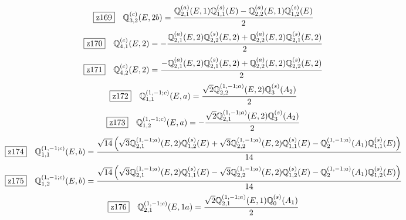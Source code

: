 \documentclass[fleqn,10pt,landscape]{jsarticle}
\begin{document}
\begin{dmath*}
\hspace*{3mm}\fbox{z169}\quad \mathbb{Q}_{3,2}^{(c)}(E,2b)=\frac{\mathbb{Q}_{2,1}^{(a)}(E,1) \mathbb{Q}_{1,1}^{(s)}(E) - \mathbb{Q}_{2,2}^{(a)}(E,1) \mathbb{Q}_{1,2}^{(s)}(E)}{2}
\end{dmath*}
\begin{dmath*}
\hspace*{3mm}\fbox{z170}\quad \mathbb{Q}_{4,1}^{(c)}(E,2)=- \frac{\mathbb{Q}_{2,1}^{(a)}(E,2) \mathbb{Q}_{2,2}^{(s)}(E,2) + \mathbb{Q}_{2,2}^{(a)}(E,2) \mathbb{Q}_{2,1}^{(s)}(E,2)}{2}
\end{dmath*}
\begin{dmath*}
\hspace*{3mm}\fbox{z171}\quad \mathbb{Q}_{4,2}^{(c)}(E,2)=\frac{- \mathbb{Q}_{2,1}^{(a)}(E,2) \mathbb{Q}_{2,1}^{(s)}(E,2) + \mathbb{Q}_{2,2}^{(a)}(E,2) \mathbb{Q}_{2,2}^{(s)}(E,2)}{2}
\end{dmath*}
\begin{dmath*}
\hspace*{3mm}\fbox{z172}\quad \mathbb{Q}_{1,1}^{(1,-1;c)}(E,a)=\frac{\sqrt{2} \mathbb{Q}_{2,2}^{(1,-1;a)}(E,2) \mathbb{Q}_{3}^{(s)}(A_{2})}{2}
\end{dmath*}
\begin{dmath*}
\hspace*{3mm}\fbox{z173}\quad \mathbb{Q}_{1,2}^{(1,-1;c)}(E,a)=- \frac{\sqrt{2} \mathbb{Q}_{2,1}^{(1,-1;a)}(E,2) \mathbb{Q}_{3}^{(s)}(A_{2})}{2}
\end{dmath*}
\begin{dmath*}
\hspace*{3mm}\fbox{z174}\quad \mathbb{Q}_{1,1}^{(1,-1;c)}(E,b)=\frac{\sqrt{14} \left(\sqrt{3} \mathbb{Q}_{2,1}^{(1,-1;a)}(E,2) \mathbb{Q}_{1,2}^{(s)}(E) + \sqrt{3} \mathbb{Q}_{2,2}^{(1,-1;a)}(E,2) \mathbb{Q}_{1,1}^{(s)}(E) - \mathbb{Q}_{2}^{(1,-1;a)}(A_{1}) \mathbb{Q}_{1,1}^{(s)}(E)\right)}{14}
\end{dmath*}
\begin{dmath*}
\hspace*{3mm}\fbox{z175}\quad \mathbb{Q}_{1,2}^{(1,-1;c)}(E,b)=\frac{\sqrt{14} \left(\sqrt{3} \mathbb{Q}_{2,1}^{(1,-1;a)}(E,2) \mathbb{Q}_{1,1}^{(s)}(E) - \sqrt{3} \mathbb{Q}_{2,2}^{(1,-1;a)}(E,2) \mathbb{Q}_{1,2}^{(s)}(E) - \mathbb{Q}_{2}^{(1,-1;a)}(A_{1}) \mathbb{Q}_{1,2}^{(s)}(E)\right)}{14}
\end{dmath*}
\begin{dmath*}
\hspace*{3mm}\fbox{z176}\quad \mathbb{Q}_{2,1}^{(1,-1;c)}(E,1a)=\frac{\sqrt{2} \mathbb{Q}_{2,1}^{(1,-1;a)}(E,1) \mathbb{Q}_{0}^{(s)}(A_{1})}{2}
\end{dmath*}
\end{document}
